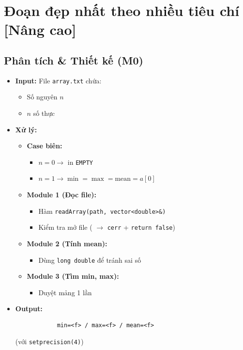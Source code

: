 \section{Đoạn đẹp nhất theo nhiều tiêu chí [Nâng cao]}
\subsection{Phân tích \& Thiết kế (M0)}
    \begin{itemize}
    \item \textbf{Input:}
    File \texttt{array.txt} chứa:
    \begin{itemize}
        \item Số nguyên $n$
        \item $n$ số thực
    \end{itemize}

    \item \textbf{Xử lý:}
        \begin{itemize}
            \item \textbf{Case biên:}
            \begin{itemize}
                \item $n = 0 \rightarrow$ in \texttt{EMPTY}
                \item $n = 1 \rightarrow \min = \max = \text{mean} = a[0]$
            \end{itemize}
            
            \item \textbf{Module 1 (Đọc file):}
            \begin{itemize}
                \item Hàm \texttt{readArray(path, vector<double>\&)}
                \item Kiểm tra mở file ( $\rightarrow$ \texttt{cerr} + \texttt{return false})
            \end{itemize}
            
            \item \textbf{Module 2 (Tính mean):}
            \begin{itemize}
                \item Dùng \texttt{long double} để tránh sai số
            \end{itemize}
            
            \item \textbf{Module 3 (Tìm min, max):}
            \begin{itemize}
                \item Duyệt mảng 1 lần
            \end{itemize}
        \end{itemize}

        \item \textbf{Output:}
        \begin{lstlisting}
            min=<f> / max=<f> / mean=<f>\end{lstlisting} 
        (với \texttt{setprecision(4)})
    \end{itemize}


